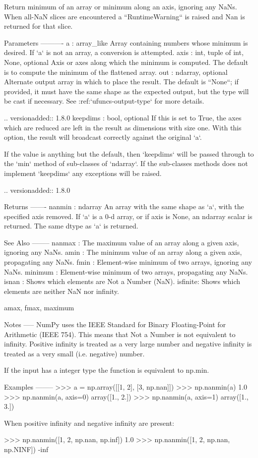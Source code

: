 \begin{DoxyVerb}Return minimum of an array or minimum along an axis, ignoring any NaNs.
When all-NaN slices are encountered a ``RuntimeWarning`` is raised and
Nan is returned for that slice.

Parameters
----------
a : array_like
    Array containing numbers whose minimum is desired. If `a` is not an
    array, a conversion is attempted.
axis : {int, tuple of int, None}, optional
    Axis or axes along which the minimum is computed. The default is to compute
    the minimum of the flattened array.
out : ndarray, optional
    Alternate output array in which to place the result.  The default
    is ``None``; if provided, it must have the same shape as the
    expected output, but the type will be cast if necessary. See
    :ref:`ufuncs-output-type` for more details.

    .. versionadded:: 1.8.0
keepdims : bool, optional
    If this is set to True, the axes which are reduced are left
    in the result as dimensions with size one. With this option,
    the result will broadcast correctly against the original `a`.

    If the value is anything but the default, then
    `keepdims` will be passed through to the `min` method
    of sub-classes of `ndarray`.  If the sub-classes methods
    does not implement `keepdims` any exceptions will be raised.

    .. versionadded:: 1.8.0

Returns
-------
nanmin : ndarray
    An array with the same shape as `a`, with the specified axis
    removed.  If `a` is a 0-d array, or if axis is None, an ndarray
    scalar is returned.  The same dtype as `a` is returned.

See Also
--------
nanmax :
    The maximum value of an array along a given axis, ignoring any NaNs.
amin :
    The minimum value of an array along a given axis, propagating any NaNs.
fmin :
    Element-wise minimum of two arrays, ignoring any NaNs.
minimum :
    Element-wise minimum of two arrays, propagating any NaNs.
isnan :
    Shows which elements are Not a Number (NaN).
isfinite:
    Shows which elements are neither NaN nor infinity.

amax, fmax, maximum

Notes
-----
NumPy uses the IEEE Standard for Binary Floating-Point for Arithmetic
(IEEE 754). This means that Not a Number is not equivalent to infinity.
Positive infinity is treated as a very large number and negative
infinity is treated as a very small (i.e. negative) number.

If the input has a integer type the function is equivalent to np.min.

Examples
--------
>>> a = np.array([[1, 2], [3, np.nan]])
>>> np.nanmin(a)
1.0
>>> np.nanmin(a, axis=0)
array([1.,  2.])
>>> np.nanmin(a, axis=1)
array([1.,  3.])

When positive infinity and negative infinity are present:

>>> np.nanmin([1, 2, np.nan, np.inf])
1.0
>>> np.nanmin([1, 2, np.nan, np.NINF])
-inf\end{DoxyVerb}
